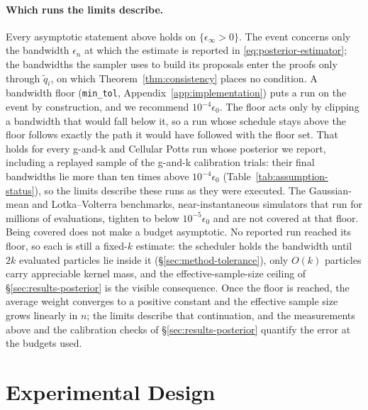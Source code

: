 \documentclass[10pt]{article}
\theoremstyle{plain}
\theoremstyle{definition}
\begin{document}
\paragraph{Which runs the limits describe.} Every asymptotic statement above holds on $\{\epsilon_\infty>0\}$. The event concerns only the bandwidth $\epsilon_n$ at which the estimate is reported in \eqref{eq:posterior-estimator}; the bandwidths the sampler uses to build its proposals enter the proofs only through $\tilde q_i$, on which Theorem~\ref{thm:consistency} places no condition. A bandwidth floor (\texttt{min\_tol}, Appendix~\ref{app:implementation}) puts a run on the event by construction, and we recommend $10^{-4}\epsilon_0$. The floor acts only by clipping a bandwidth that would fall below it, so a run whose schedule stays above the floor follows exactly the path it would have followed with the floor set. That holds for every g-and-k and Cellular Potts run whose posterior we report, including a replayed sample of the g-and-k calibration trials: their final bandwidths lie more than ten times above $10^{-4}\epsilon_0$ (Table~\ref{tab:assumption-status}), so the limits describe these runs as they were executed.
The Gaussian-mean and Lotka--Volterra benchmarks, near-instantaneous simulators that run for millions of evaluations, tighten to below $10^{-5}\epsilon_0$ and are not covered at that floor. Being covered does not make a budget asymptotic. No reported run reached its floor, so each is still a fixed-$k$ estimate: the scheduler holds the bandwidth until $2k$ evaluated particles lie inside it (\S\ref{sec:method-tolerance}), only $O(k)$ particles carry appreciable kernel mass, and the effective-sample-size ceiling of \S\ref{sec:results-posterior} is the visible consequence. Once the floor is reached, the average weight converges to a positive constant and the effective sample size grows linearly in $n$; the limits describe that continuation, and the measurements above and the calibration checks of \S\ref{sec:results-posterior} quantify the error at the budgets used.


\section{Experimental Design}\label{sec:experiments}
\end{document}
